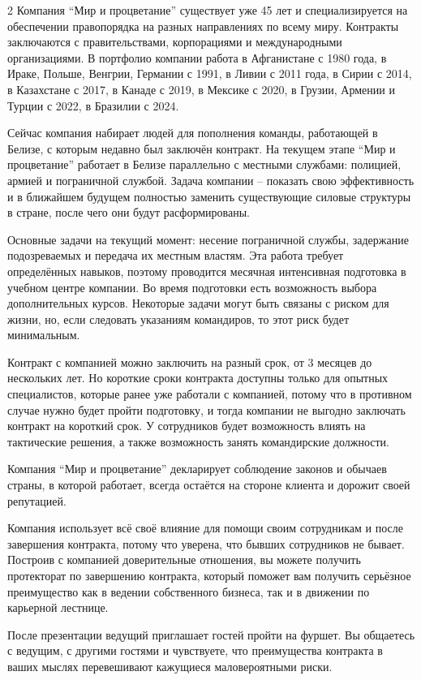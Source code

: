 \documentclass[twoside]{article}
\begin{document}
\begin{multicols}{2}
Компания \enquote{Мир и процветание} существует уже 45 лет и специализируется на
обеспечении правопорядка на разных направлениях по всему миру. Контракты
заключаются с правительствами, корпорациями и международными
организациями. В портфолио компании работа в Афганистане с 1980 года, в
Ираке, Польше, Венгрии, Германии с 1991, в Ливии с 2011 года, в Сирии с
2014, в Казахстане с 2017, в Канаде с 2019, в Мексике с 2020, в Грузии,
Армении и Турции с 2022, в Бразилии с 2024.

Сейчас компания набирает людей для пополнения команды, работающей в
Белизе, с которым недавно был заключён контракт. На текущем этапе \enquote{Мир и
процветание} работает в Белизе параллельно с местными службами:
полицией, армией и пограничной службой. Задача компании -- показать свою
эффективность и в ближайшем будущем полностью заменить существующие
силовые структуры в стране, после чего они будут расформированы.

Основные задачи на текущий момент: несение пограничной службы,
задержание подозреваемых и передача их местным властям. Эта работа
требует определённых навыков, поэтому проводится месячная интенсивная
подготовка в учебном центре компании. Во время подготовки есть
возможность выбора дополнительных курсов. Некоторые задачи могут быть
связаны с риском для жизни, но, если следовать указаниям командиров, то
этот риск будет минимальным.

Контракт с компанией можно заключить на разный срок, от 3 месяцев до
нескольких лет. Но короткие сроки контракта доступны только для опытных
специалистов, которые ранее уже работали с компанией, потому что в
противном случае нужно будет пройти подготовку, и тогда компании не
выгодно заключать контракт на короткий срок. У сотрудников будет
возможность влиять на тактические решения, а также возможность занять
командирские должности.

Компания \enquote{Мир и процветание} декларирует соблюдение законов и обычаев
страны, в которой работает, всегда остаётся на стороне клиента и дорожит
своей репутацией.

Компания использует всё своё влияние для помощи своим сотрудникам и
после завершения контракта, потому что уверена, что бывших сотрудников
не бывает. Построив с компанией доверительные отношения, вы можете
получить протекторат по завершению контракта, который поможет вам
получить серьёзное преимущество как в ведении собственного бизнеса, так
и в движении по карьерной лестнице.

После презентации ведущий приглашает гостей пройти на фуршет. Вы
общаетесь с ведущим, с другими гостями и чувствуете, что преимущества
контракта в ваших мыслях перевешивают кажущиеся маловероятными риски.


\end{multicols}
\end{document}
